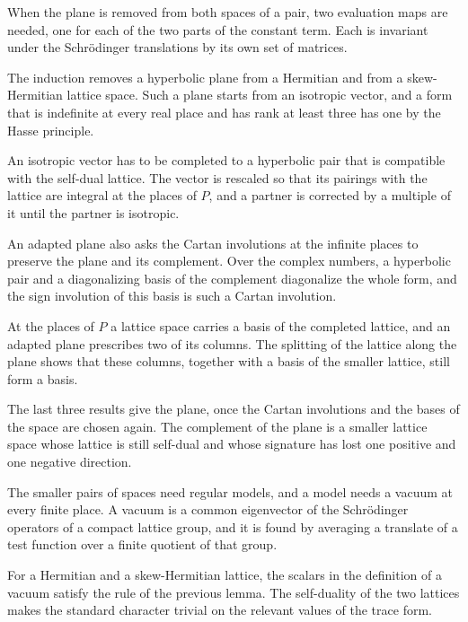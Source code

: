 When the plane is removed from both spaces of a pair, two evaluation maps are
needed, one for each of the two parts of the constant term. Each is invariant
under the Schrödinger translations by its own set of matrices.

The induction removes a hyperbolic plane from a Hermitian and from a
skew-Hermitian lattice space. Such a plane starts from an isotropic vector,
and a form that is indefinite at every real place and has rank at least three
has one by the Hasse principle.

An isotropic vector has to be completed to a hyperbolic pair that is compatible
with the self-dual lattice. The vector is rescaled so that its pairings with
the lattice are integral at the places of $P$, and a partner is corrected by a
multiple of it until the partner is isotropic.

An adapted plane also asks the Cartan involutions at the infinite places to
preserve the plane and its complement. Over the complex numbers, a hyperbolic
pair and a diagonalizing basis of the complement diagonalize the whole form,
and the sign involution of this basis is such a Cartan involution.

At the places of $P$ a lattice space carries a basis of the completed lattice,
and an adapted plane prescribes two of its columns. The splitting of the
lattice along the plane shows that these columns, together with a basis of
the smaller lattice, still form a basis.

The last three results give the plane, once the Cartan involutions and the
bases of the space are chosen again. The complement of the plane is a smaller
lattice space whose lattice is still self-dual and whose signature has lost
one positive and one negative direction.

The smaller pairs of spaces need regular models, and a model needs a vacuum
at every finite place. A vacuum is a common eigenvector of the Schrödinger
operators of a compact lattice group, and it is found by averaging a
translate of a test function over a finite quotient of that group.

For a Hermitian and a skew-Hermitian lattice, the scalars in the definition of
a vacuum satisfy the rule of the previous lemma. The self-duality of the two
lattices makes the standard character trivial on the relevant values of the
trace form.

